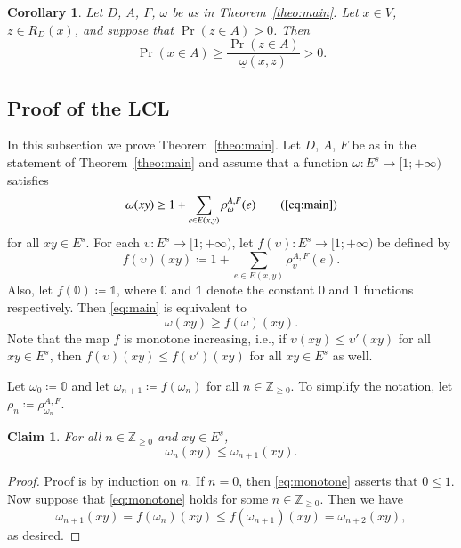 \documentclass[10pt]{article}
\numberwithin{equation}{subsection}
\newtheorem{corl}[theo]{Corollary}
\newtheorem{claim}[theo]{Claim}
\theoremstyle{definition}
\begin{document}
	\begin{corl}\label{corl:positive}
		Let $D$, $A$, $F$, $\omega$ be as in Theorem~\ref{theo:main}. Let $x\in V$, $z \in R_D(x)$, and suppose that $\Pr(z \in A) > 0$. Then
		$$
		\Pr(x \in A) \geq \frac{\Pr(z \in A)}{\underline{\omega}(x,z)} > 0.
		$$
	\end{corl}
	
	\subsection{Proof of the LCL}\label{subsec:proof}
	
	In this subsection we prove Theorem~\ref{theo:main}. Let $D$, $A$, $F$ be as in the statement of Theorem~\ref{theo:main} and assume that a function $\omega \colon E^s \to [1; +\infty)$ satisfies
	\begin{equation}
	\omega(xy) \geq 1 + \sum_{e \in E(x,y)} \rho^{A, F}_\omega(e)\tag{\ref{eq:main}}
	\end{equation}
	for all $xy \in E^s$. For each $\upsilon \colon E^s \to [1; +\infty)$, let $f(\upsilon) \colon E^s \to [1; +\infty)$ be defined by
	$$
	f(\upsilon)(xy) \coloneqq 1 + \sum_{e \in E(x,y)} \rho^{A,F}_\upsilon(e).
	$$
	Also, let $f(\mathbb{0}) \coloneqq \mathbb{1}$, where $\mathbb{0}$ and $\mathbb{1}$ denote the constant $0$ and $1$ functions respectively. Then \eqref{eq:main} is equivalent to
	\begin{equation}\label{eq:main1}
	\omega(xy) \geq f(\omega)(xy).
	\end{equation}
	Note that the map $f$ is monotone increasing, i.e., if $\upsilon(xy) \leq \upsilon'(xy)$ for all $xy \in E^s$, then $f(\upsilon)(xy) \leq f(\upsilon')(xy)$ for all $xy \in E^s$ as well.
	
	Let $\omega_0 \coloneqq \mathbb{0}$ and let $\omega_{n+1} \coloneqq f(\omega_n)$ for all $n \in \mathbb{Z}_{\geq 0}$. To simplify the notation, let $\rho_n \coloneqq \rho^{A, F}_{\omega_n}$.
	
	\begin{claim}
		For all $n \in \mathbb{Z}_{\geq 0}$ and $xy \in E^s$,
		\begin{equation}\label{eq:monotone}
		\omega_n(xy) \leq \omega_{n+1}(xy).
		\end{equation}
	\end{claim}
	\begin{proof}
		Proof is by induction on $n$. If $n=0$, then \eqref{eq:monotone} asserts that $0 \leq 1$. Now suppose that \eqref{eq:monotone} holds for some $n \in \mathbb{Z}_{\geq 0}$. Then we have
		$$
		\omega_{n+1}(xy) = f(\omega_n)(xy) \leq f(\omega_{n+1})(xy) = \omega_{n+2}(xy),
		$$
		as desired.
	\end{proof}
	
\end{document}
